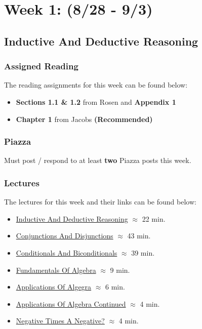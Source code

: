 \clearpage
\chapter{Week 1: (8/28 - 9/3)}

\section{Inductive And Deductive Reasoning}

\subsection{Assigned Reading}

The reading assignments for this week can be found below:

\begin{itemize}
    \item \textbf{Sections 1.1 \& 1.2} from Rosen and \textbf{Appendix 1}
    \item \textbf{Chapter 1} from Jacobs \textbf{(Recommended)}
\end{itemize}

\subsection{Piazza}

Must post / respond to at least \textbf{two} Piazza posts this week.  

\subsection{Lectures}

The lectures for this week and their links can be found below:

\begin{itemize}
    \item \href{https://drive.explaineverything.com/thecode/GYWSZFB}{Inductive And Deductive Reasoning} $\approx$ 22 min.
    \item \href{https://applied.cs.colorado.edu/mod/hvp/view.php?id=51549}{Conjunctions And Disjunctions} $\approx$ 43 min.
    \item \href{https://applied.cs.colorado.edu/mod/hvp/view.php?id=51550}{Conditionals And Biconditionals} $\approx$ 39 min.
    \item \href{https://applied.cs.colorado.edu/mod/hvp/view.php?id=51552}{Fundamentals Of Algebra} $\approx$ 9 min.
    \item \href{https://applied.cs.colorado.edu/mod/hvp/view.php?id=51553}{Applications Of Algegra} $\approx$ 6 min.
    \item \href{https://applied.cs.colorado.edu/mod/hvp/view.php?id=51554}{Applications Of Algebra Continued} $\approx$ 4 min.
    \item \href{https://applied.cs.colorado.edu/mod/hvp/view.php?id=51555}{Negative Times A Negative?} $\approx$ 4 min.
\end{itemize}

